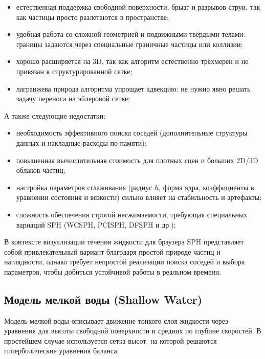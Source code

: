 \begin{itemize}
      \item естественная поддержка свободной поверхности,
            брызг и разрывов струи, так как частицы просто
            разлетаются в пространстве;
      \item удобная работа со сложной геометрией и подвижными
            твёрдыми телами: границы задаются через специальные
            граничные частицы или коллизии;
      \item хорошо расширяется на 3D, так как алгоритм
            естественно трёхмерен и не привязан к структурированной
            сетке;
      \item лагранжева природа алгоритма упрощает адвекцию: не нужно
            явно решать задачу переноса на эйлеровой сетке;
\end{itemize}

А также следующие недостатки:

\begin{itemize}
      \item необходимость эффективного поиска соседей (дополнительные
            структуры данных и накладные расходы по памяти);
      \item повышенная вычислительная стоимость для плотных сцен
            и больших 2D/3D облаков частиц;
      \item настройка параметров сглаживания (радиус $h$, форма
            ядра, коэффициенты в уравнении состояния и вязкости)
            сильно влияет на стабильность и артефакты;
      \item сложность обеспечения строгой несжимаемости,
            требующая специальных вариаций SPH (WCSPH, PCISPH,
            DFSPH и др.);
\end{itemize}

В контексте визуализации течения жидкости для браузера SPH
представляет собой привлекательный вариант благодаря простой природе частиц
и наглядности, однако требует непростой реализации поиска соседей и выбора параметров, чтобы
добиться устойчивой работы в реальном времени.

\subsection{Модель мелкой воды (Shallow Water)}

Модель мелкой воды описывает движение тонкого слоя
жидкости через уравнения для высоты свободной
поверхности и средних по глубине скоростей. В простейшем
случае используется сетка высот, на которой решаются
гиперболические уравнения баланса.

